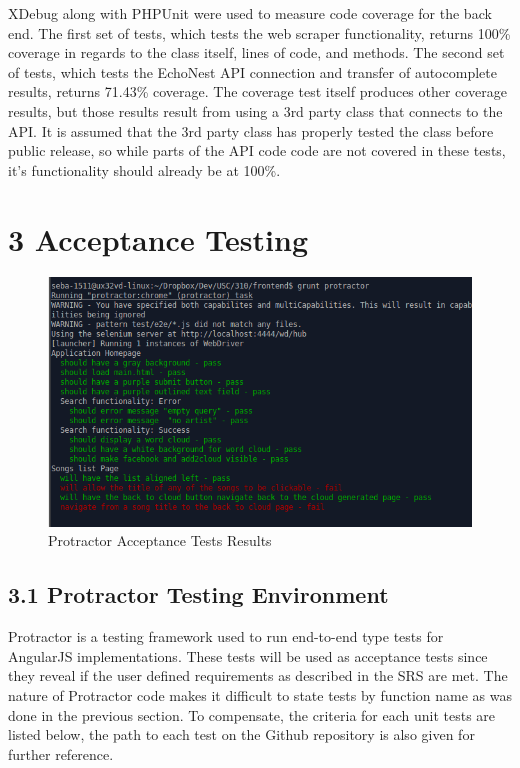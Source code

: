 \documentclass[]{article}
\begin{document}
XDebug along with PHPUnit were used to measure code coverage for the
back end. The first set of tests, which tests the web scraper
functionality, returns 100\% coverage in regards to the class itself,
lines of code, and methods. The second set of tests, which tests the
EchoNest API connection and transfer of autocomplete results, returns
71.43\% coverage. The coverage test itself produces other coverage
results, but those results result from using a 3rd party class that
connects to the API. It is assumed that the 3rd party class has properly
tested the class before public release, so while parts of the API code
code are not covered in these tests, it's functionality should already
be at 100\%.

\section{3 Acceptance Testing}\label{acceptance-testing}

\begin{figure}[htbp]
\centering
\includegraphics{protractor.png}
\caption{Protractor Acceptance Tests Results}
\end{figure}

\subsection{3.1 Protractor Testing
Environment}\label{protractor-testing-environment}

Protractor is a testing framework used to run end-to-end type tests for
AngularJS implementations. These tests will be used as acceptance tests
since they reveal if the user defined requirements as described in the
SRS are met. The nature of Protractor code makes it difficult to state
tests by function name as was done in the previous section. To
compensate, the criteria for each unit tests are listed below, the path
to each test on the Github repository is also given for further
reference.
\end{document}
